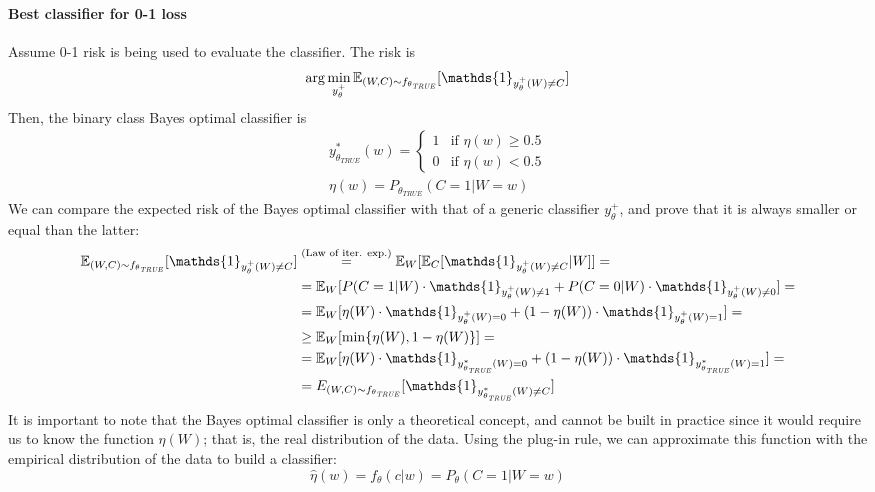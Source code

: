 \paragraph{Best classifier for 0-1 loss}
Assume 0-1 risk is being used to evaluate the classifier. The risk is
\begin{equation*}
    \arg \min_{y_{\theta}^+} \E_{(W,C) \sim f_{\theta_{\textit{TRUE}}}}[\mathds{1}_{y_{\theta}^+ (W) \not = C}]
\end{equation*}
Then, the binary class Bayes optimal classifier is
\begin{gather*}
    y_{\theta_{\textit{TRUE}}}^*(w) = \begin{cases}
        1 & \text{if } \eta(w) \geq 0.5 \\
        0 & \text{if } \eta(w) < 0.5
    \end{cases} \\
    \eta(w) = P_{\theta_{\textit{TRUE}}}(C = 1 | W = w)
\end{gather*}
We can compare the expected risk of the Bayes optimal classifier with that of a generic classifier $y_{\theta}^+$, and prove that it is always smaller or equal than the latter:
\begin{align*}
    \E_{(W,C) \sim f_{\theta_{\textit{TRUE}}}}[\mathds{1}_{y_{\theta}^+(W) \not = C}] &\stackrel{\text{(Law of iter. exp.)}}{=} \E_W[\E_C[\mathds{1}_{y_{\theta}^+(W) \not = C} | W]] = \\
    &= \E_W[P(C=1|W) \cdot \mathds{1}_{y_{\theta}^+(W) \not = 1} + P(C=0|W) \cdot \mathds{1}_{y_{\theta}^+(W) \not = 0}] =\\
    &= \E_W[\eta(W) \cdot \mathds{1}_{y_{\theta}^+(W) = 0} + (1 - \eta(W)) \cdot \mathds{1}_{y_{\theta}^+(W) = 1}] = \\
    &\geq \E_W[\min \{ \eta(W), 1-\eta(W) \}] = \\
    &= \E_W[\eta(W) \cdot \mathds{1}_{y_{\theta_\textit{TRUE}}^*(W) = 0} + (1 - \eta(W)) \cdot \mathds{1}_{y_{\theta_\textit{TRUE}}^*(W) = 1}] = \\
    &= E_{(W,C) \sim f_{\theta_\textit{TRUE}}}[\mathds{1}_{y_{\theta_\textit{TRUE}}^*(W) \not = C}]
\end{align*}
It is important to note that the Bayes optimal classifier is only a theoretical concept, and cannot be built in practice since it would require us to know the function $\eta(W)$; that is, the real distribution of the data. Using the plug-in rule, we can approximate this function with the empirical distribution of the data to build a classifier:
\begin{equation*}
    \hat{\eta}(w) = f_{\theta}(c|w) = P_{\theta}(C=1|W=w)
\end{equation*}


